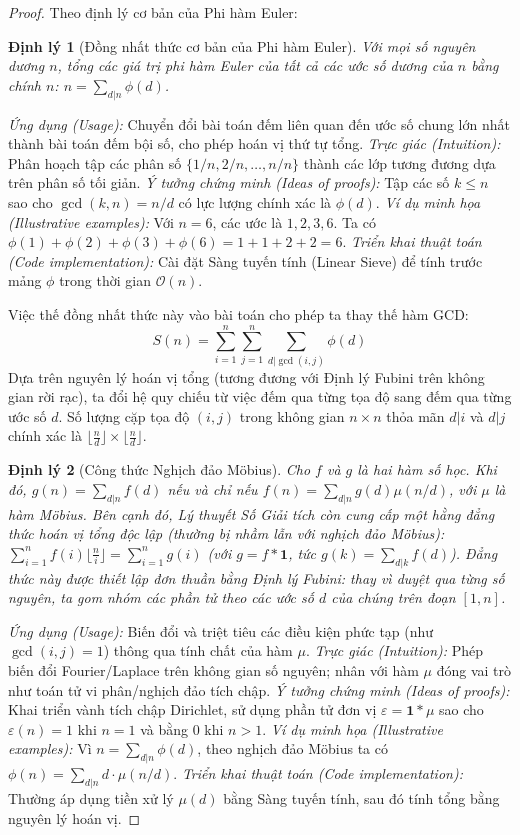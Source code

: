 \documentclass{article}
\newtheorem{dinhly}{Định lý}
\begin{document}
\begin{proof}
Theo định lý cơ bản của Phi hàm Euler:
\begin{dinhly}[Đồng nhất thức cơ bản của Phi hàm Euler]
Với mọi số nguyên dương $n$, tổng các giá trị phi hàm Euler của tất cả các ước số dương của $n$ bằng chính $n$: $n = \sum_{d|n} \phi(d)$.
\end{dinhly}
\emph{Ứng dụng (Usage):} Chuyển đổi bài toán đếm liên quan đến ước số chung lớn nhất thành bài toán đếm bội số, cho phép hoán vị thứ tự tổng.
\emph{Trực giác (Intuition):} Phân hoạch tập các phân số $\{1/n, 2/n, \dots, n/n\}$ thành các lớp tương đương dựa trên phân số tối giản.
\emph{Ý tưởng chứng minh (Ideas of proofs):} Tập các số $k \le n$ sao cho $\gcd(k, n) = n/d$ có lực lượng chính xác là $\phi(d)$.
\emph{Ví dụ minh họa (Illustrative examples):} Với $n=6$, các ước là $1, 2, 3, 6$. Ta có $\phi(1) + \phi(2) + \phi(3) + \phi(6) = 1 + 1 + 2 + 2 = 6$.
\emph{Triển khai thuật toán (Code implementation):} Cài đặt Sàng tuyến tính (Linear Sieve) để tính trước mảng $\phi$ trong thời gian $\mathcal{O}(n)$.

Việc thế đồng nhất thức này vào bài toán cho phép ta thay thế hàm GCD:
\begin{equation*}
 S(n) = \sum_{i=1}^n \sum_{j=1}^n \sum_{d|\gcd(i,j)} \phi(d)
\end{equation*}
Dựa trên nguyên lý hoán vị tổng (tương đương với Định lý Fubini trên không gian rời rạc), ta đổi hệ quy chiếu từ việc đếm qua từng tọa độ sang đếm qua từng ước số $d$. Số lượng cặp tọa độ $(i, j)$ trong không gian $n \times n$ thỏa mãn $d|i$ và $d|j$ chính xác là $\lfloor \frac{n}{d} \rfloor \times \lfloor \frac{n}{d} \rfloor$.

\begin{dinhly}[Công thức Nghịch đảo Möbius]
Cho $f$ và $g$ là hai hàm số học. Khi đó, $g(n) = \sum_{d|n} f(d)$ nếu và chỉ nếu $f(n) = \sum_{d|n} g(d) \mu(n/d)$, với $\mu$ là hàm Möbius. Bên cạnh đó, Lý thuyết Số Giải tích còn cung cấp một hằng đẳng thức hoán vị tổng độc lập (thường bị nhầm lẫn với nghịch đảo Möbius): $\sum_{i=1}^n f(i) \lfloor \frac{n}{i} \rfloor = \sum_{i=1}^n g(i)$ (với $g = f * \mathbf{1}$, tức $g(k) = \sum_{d|k} f(d)$). Đẳng thức này được thiết lập đơn thuần bằng Định lý Fubini: thay vì duyệt qua từng số nguyên, ta gom nhóm các phần tử theo các ước số $d$ của chúng trên đoạn $[1, n]$.
\end{dinhly}
\emph{Ứng dụng (Usage):} Biến đổi và triệt tiêu các điều kiện phức tạp (như $\gcd(i, j) = 1$) thông qua tính chất của hàm $\mu$.
\emph{Trực giác (Intuition):} Phép biến đổi Fourier/Laplace trên không gian số nguyên; nhân với hàm $\mu$ đóng vai trò như toán tử vi phân/nghịch đảo tích chập.
\emph{Ý tưởng chứng minh (Ideas of proofs):} Khai triển vành tích chập Dirichlet, sử dụng phần tử đơn vị $\varepsilon = \mathbf{1} * \mu$ sao cho $\varepsilon(n) = 1$ khi $n=1$ và bằng $0$ khi $n > 1$.
\emph{Ví dụ minh họa (Illustrative examples):} Vì $n = \sum_{d|n} \phi(d)$, theo nghịch đảo Möbius ta có $\phi(n) = \sum_{d|n} d \cdot \mu(n/d)$.
\emph{Triển khai thuật toán (Code implementation):} Thường áp dụng tiền xử lý $\mu(d)$ bằng Sàng tuyến tính, sau đó tính tổng bằng nguyên lý hoán vị.


\end{proof}
\end{document}

